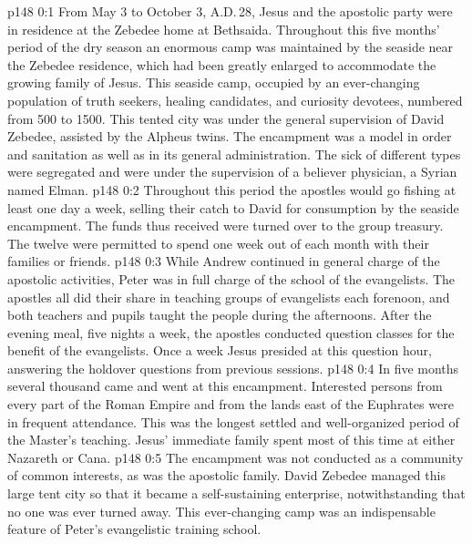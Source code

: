 \author{Midwayer Commission}
\vs p148 0:1 From May 3 to October 3, A.D.\,28, Jesus and the apostolic party were in residence at the Zebedee home at Bethsaida. Throughout this five months’ period of the dry season an enormous camp was maintained by the seaside near the Zebedee residence, which had been greatly enlarged to accommodate the growing family of Jesus. This seaside camp, occupied by an ever\hyp{}changing population of truth seekers, healing candidates, and curiosity devotees, numbered from 500 to 1500. This tented city was under the general supervision of David Zebedee, assisted by the Alpheus twins. The encampment was a model in order and sanitation as well as in its general administration. The sick of different types were segregated and were under the supervision of a believer physician, a Syrian named Elman.
\vs p148 0:2 Throughout this period the apostles would go fishing at least one day a week, selling their catch to David for consumption by the seaside encampment. The funds thus received were turned over to the group treasury. The twelve were permitted to spend one week out of each month with their families or friends.
\vs p148 0:3 While Andrew continued in general charge of the apostolic activities, Peter was in full charge of the school of the evangelists. The apostles all did their share in teaching groups of evangelists each forenoon, and both teachers and pupils taught the people during the afternoons. After the evening meal, five nights a week, the apostles conducted question classes for the benefit of the evangelists. Once a week Jesus presided at this question hour, answering the holdover questions from previous sessions.
\vs p148 0:4 In five months several thousand came and went at this encampment. Interested persons from every part of the Roman Empire and from the lands east of the Euphrates were in frequent attendance. This was the longest settled and well\hyp{}organized period of the Master’s teaching. Jesus’ immediate family spent most of this time at either Nazareth or Cana.
\vs p148 0:5 The encampment was not conducted as a community of common interests, as was the apostolic family. David Zebedee managed this large tent city so that it became a self\hyp{}sustaining enterprise, notwithstanding that no one was ever turned away. This ever\hyp{}changing camp was an indispensable feature of Peter’s evangelistic training school.

